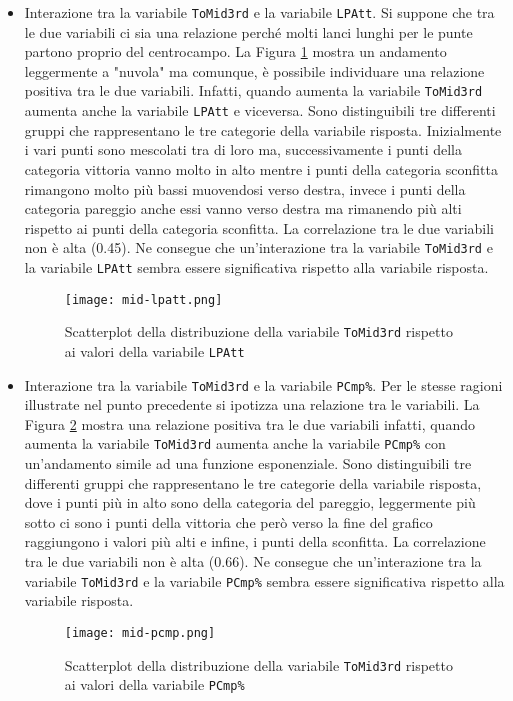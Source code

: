\begin{itemize}
	\item Interazione tra la variabile \texttt{ToMid3rd} e la variabile \texttt{LPAtt}. Si suppone che tra le due variabili ci sia una relazione perché molti lanci lunghi per le punte partono proprio del centrocampo. La Figura \ref{fig:midl} mostra un andamento leggermente a "nuvola" ma comunque, è possibile individuare una relazione positiva tra le due variabili. Infatti, quando aumenta la variabile \texttt{ToMid3rd} aumenta anche la variabile \texttt{LPAtt} e viceversa. Sono distinguibili tre differenti gruppi che rappresentano le tre categorie della variabile risposta. Inizialmente i vari punti sono mescolati tra di loro ma, successivamente i punti della categoria vittoria vanno molto in alto mentre i punti della categoria sconfitta rimangono molto più bassi muovendosi verso destra, invece i punti della categoria pareggio anche essi vanno verso destra ma rimanendo più alti rispetto ai punti della categoria sconfitta. La correlazione tra le due variabili non è alta (0.45). Ne consegue che un'interazione tra la variabile \texttt{ToMid3rd} e la variabile \texttt{LPAtt} sembra essere significativa rispetto alla variabile risposta.
	\begin{figure}[htbp]
		\begin{center}
			\texttt{[image: mid-lpatt.png]}
			\caption{Scatterplot della distribuzione della variabile \texttt{ToMid3rd} rispetto ai valori della variabile \texttt{LPAtt}}  \label{fig:midl}
		\end{center}
	\end{figure}
	\item Interazione tra la variabile \texttt{ToMid3rd} e la variabile \texttt{PCmp\%}. Per le stesse ragioni illustrate nel punto precedente si ipotizza una relazione tra le variabili. La Figura \ref{fig:midp} mostra una relazione positiva tra le due variabili infatti, quando aumenta la variabile \texttt{ToMid3rd} aumenta anche la variabile \texttt{PCmp\%} con un'andamento simile ad una funzione esponenziale. Sono distinguibili tre differenti gruppi che rappresentano le tre categorie della variabile risposta, dove i punti più in alto sono della categoria del pareggio, leggermente più sotto ci sono i punti della vittoria che però verso la fine del grafico raggiungono i valori più alti e infine, i punti della sconfitta. La correlazione tra le due variabili non è alta (0.66). Ne consegue che un'interazione tra la variabile \texttt{ToMid3rd} e la variabile \texttt{PCmp\%} sembra essere significativa rispetto alla variabile risposta.
	\begin{figure}[htbp]
		\begin{center}
			\texttt{[image: mid-pcmp.png]}
			\caption{Scatterplot della distribuzione della variabile \texttt{ToMid3rd} rispetto ai valori della variabile \texttt{PCmp\%}}  \label{fig:midp}
		\end{center}
	\end{figure}
\end{itemize}

